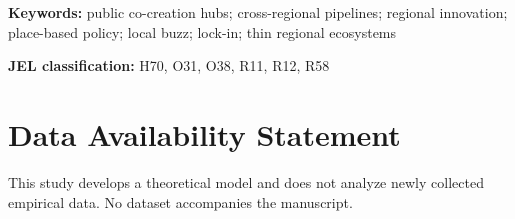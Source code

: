 \documentclass[12pt]{article}
\theoremstyle{plain}
\theoremstyle{remark}
\newcommand{\JELcodes}{H70, O31, O38, R11, R12, R58}
\newcommand{\keywordslist}{public co-creation hubs; cross-regional pipelines; regional innovation; place-based policy; local buzz; lock-in; thin regional ecosystems}
\begin{document}
\vspace{0.8em}
\noindent\textbf{Keywords:} \keywordslist

\vspace{0.35em}
\noindent\textbf{JEL classification:} \JELcodes

\vspace{1.0em}











\section*{Data Availability Statement}
This study develops a theoretical model and does not analyze newly collected empirical data. No dataset accompanies the manuscript.



\appendix




\end{document}
